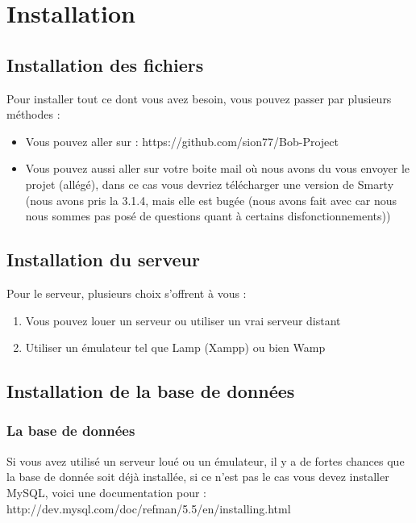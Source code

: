 \section{Installation}
\subsection{Installation des fichiers}
	Pour installer tout ce dont vous avez besoin, vous pouvez passer par plusieurs méthodes :

\begin{itemize}
	\item Vous pouvez aller sur : https://github.com/sion77/Bob-Project
	\item Vous pouvez aussi aller sur votre boite mail où nous avons du vous envoyer le projet (allégé), dans ce cas vous devriez télécharger une version de Smarty (nous avons pris la 3.1.4, mais elle est bugée (nous avons fait avec car nous nous sommes pas posé de questions quant à certains disfonctionnements))
\end{itemize}

\subsection{Installation du serveur}
	Pour le serveur, plusieurs choix s'offrent à vous :
	\begin{enumerate}
		\item Vous pouvez louer un serveur ou utiliser un vrai serveur distant
		\item Utiliser un émulateur tel que Lamp (Xampp) ou bien Wamp
	\end{enumerate}

\subsection{Installation de la base de données}

	\subsubsection{La base de données}
	
	Si vous avez utilisé un serveur loué ou un émulateur, il y a de fortes chances que la base de donnée soit déjà installée, si ce n'est pas le cas
vous devez installer MySQL, voici une documentation pour :\\
http://dev.mysql.com/doc/refman/5.5/en/installing.html\\

